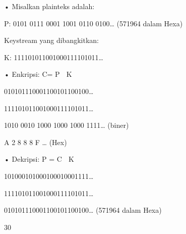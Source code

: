 \documentclass{article}
\begin{document}

• Misalkan plainteks adalah:

                  P: 0101 0111 0001 1001 0110 0100…   (571964 dalam Hexa)

   Keystream yang dibangkitkan: 

                  K: 111101011001000111101011…

• Enkripsi: C= P  K

                  010101110001100101100100…


111101011001000111101011…    

                  1010 0010 1000 1000 1000 1111…    (biner)

                      A       2       8       8       8         F    …     (Hex)        

• Dekripsi: P = C  K       

                  101000101000100010001111…

                  111101011001000111101011…    

                  010101110001100101100100…          (571964 dalam Hexa)    

30
\end{document}

